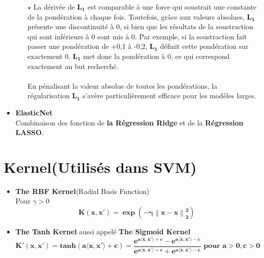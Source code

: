 \documentclass[french]{article}
\newcommand*{\norme}[1]{\left\lVert{#1}\right\rVert}
\begin{document}
\begin{itemize}[label=\textbullet, font=\LARGE \color{red}]
\begin{itemize}
	\item[$\star$] La dérivée de $\bm{L_{1}}$ est comparable à une force qui soustrait une constante de la pondération à chaque fois. Toutefois, grâce aux valeurs absolues, $\bm{L_{1}}$ présente une discontinuité à 0, si bien que les résultats de la soustraction qui sont inférieurs à 0 sont mis à 0. Par exemple, si la soustraction fait passer une pondération de +0,1 à -0,2, $\bm{L_{1}}$ définit cette pondération sur exactement 0. $\bm{L_{1}}$ met donc la pondération à 0, ce qui correspond exactement au but recherché.\\\\En pénalisant la valeur absolue de toutes les pondérations, la régularisation $\bm{L_{1}}$ s'avère particulièrement efficace pour les modèles larges.\\
\end{itemize}
 


\item \textbf{ElasticNet}\\
Combinaison des fonction de \textbf{la Régression Ridge} et de la \textbf{Régression LASSO}.

\end{itemize}

	
    \section{Kernel(Utilisés dans SVM)}
    \begin{itemize}[label=\textbullet, font=\LARGE \color{red}]
        \item \textbf{The RBF Kernel}(Radial Basis Function)\\
        Pour $\gamma>0$ $$\bm{K(x,x') = \exp(-\gamma\norme{x-x}^{2}_{2})}$$ 
        \item \textbf{The Tanh Kernel} aussi appelé \textbf{The Sigmoid Kernel}\\
        $$\bm{K'(x,x')=tanh(a\langle x,x'\rangle + c) = \frac{e^{a\langle x,x'\rangle + c}-e^{a\langle x,x'\rangle - c}}{e^{a\langle x,x'\rangle + c}+e^{a\langle x,x'\rangle - c}} \text{ pour } a>0,c>0}$$
    \end{itemize}

	
\end{document}
